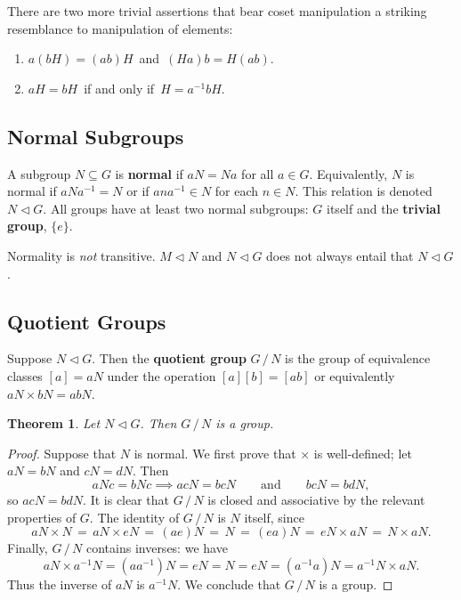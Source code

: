 \documentclass[11pt]{article}
\newtheorem{theorem}{Theorem}
\newcommand{\nsg}{\mathrel{\lhd}}
\begin{document}
There are two more trivial assertions that bear coset manipulation a striking resemblance to manipulation of elements:
\begin{enumerate}
  \item $a(bH) = (ab)H \,$ and $\, (Ha)b = H(ab)$.
  \item $aH = bH \, $ if and only if $\, H = a^{-1}bH$.
\end{enumerate}


\subsection{Normal Subgroups}

A subgroup $N \subseteq G$ is \textbf{normal} if $aN = Na$ for all $a \in G$. Equivalently, $N$ is normal if $aNa^{-1} = N$ or if $ana^{-1} \in N$ for each $n \in N$. This relation is denoted $N \nsg G$. All groups have at least two normal subgroups: $G$ itself and the \textbf{trivial group}, $\{ e \}$.

Normality is \textit{not} transitive. $M \nsg N$ and $N \nsg G$ does not always entail that $N \nsg G$.


\subsection{Quotient Groups}

Suppose $N \nsg G$. Then the \textbf{quotient group} $G \, / \, N$ is the group of equivalence classes $[a] = aN$ under the operation $[a][b] = [ab]$ or equivalently $aN \times bN = abN$.

\begin{adjustwidth}{0.5cm}{}
  \begin{theorem}
    Let $N \nsg G$. Then $G \, / \, N$ is a group.
  \end{theorem}
  \begin{proof}
    Suppose that $N$ is normal. We first prove that $\times$ is well-defined; let $aN = bN$ and $cN = dN$. Then
    \[
      aNc = bNc \implies acN = bcN \qquad \text{and} \qquad bcN = bdN,
    \]
    so $acN = bdN$. It is clear that $G \, / \, N$ is closed and associative by the relevant properties of $G$. The identity of $G \, / \, N$ is $N$ itself, since
    \[
      aN \times N \, = \, aN \times eN \, = \, (ae)N \, = \, N \, = \, (ea)N \, = \, eN \times aN \, = \, N \times aN.
    \]
    Finally, $G \, / \, N$ contains inverses: we have
    \[
      aN \times a^{-1}N = (a a^{-1})N = eN = N = eN = (a^{-1}a)N = a^{-1}N \times aN.
    \]
    Thus the inverse of $aN$ is $a^{-1}N$. We conclude that $G \, / \, N$ is a group. 
  \end{proof}
\end{adjustwidth}
\end{document}
